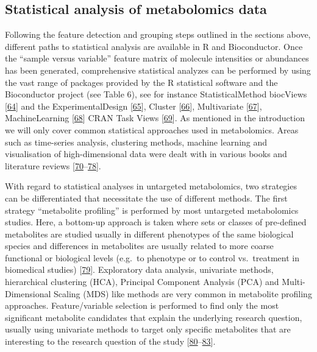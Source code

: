 \documentclass[]{article}
\begin{document}
\newpage

\hypertarget{statistical-analysis-of-metabolomics-data}{%
\subsection{Statistical analysis of metabolomics data}\label{statistical-analysis-of-metabolomics-data}}

Following the feature detection and grouping steps outlined in the sections above, different paths to statistical analysis are available in R and Bioconductor. Once the ``sample versus variable'' feature matrix of molecule intensities or abundances has been generated, comprehensive statistical analyzes can be performed by using the vast range of packages provided by the R statistical software and the Bioconductor project (see Table 6), see for instance StatisticalMethod biocViews {[}\protect\hyperlink{ref-bioconductor_website_ndb}{64}{]} and the ExperimentalDesign {[}\protect\hyperlink{ref-groemping_website_2019}{65}{]}, Cluster {[}\protect\hyperlink{ref-leisch_website_2019}{66}{]}, Multivariate {[}\protect\hyperlink{ref-hewson_website_2018}{67}{]}, MachineLearning {[}\protect\hyperlink{ref-hothorn_website_2019}{68}{]} CRAN Task Views {[}\protect\hyperlink{ref-thecomprehensiverarchivenetwork_website_nda}{69}{]}. As mentioned in the introduction we will only cover common statistical approaches used in metabolomics. Areas such as time-series analysis, clustering methods, machine learning and visualisation of high-dimensional data were dealt with in various books and literature reviews {[}\protect\hyperlink{ref-bishop_2006}{70}--\protect\hyperlink{ref-zaslavsky_2016}{78}{]}.

With regard to statistical analyses in untargeted metabolomics, two strategies can be differentiated that necessitate the use of different methods. The first strategy ``metabolite profiling'' is performed by most untargeted metabolomics studies. Here, a bottom-up approach is taken where sets or classes of pre-defined metabolites are studied usually in different phenotypes of the same biological species and differences in metabolites are usually related to more coarse functional or biological levels (e.g.~to phenotype or to control vs.~treatment in biomedical studies) {[}\protect\hyperlink{ref-hall_2011}{79}{]}. Exploratory data analysis, univariate methods, hierarchical clustering (HCA), Principal Component Analysis (PCA) and Multi-Dimensional Scaling (MDS) like methods are very common in metabolite profiling approaches. Feature/variable selection is performed to find only the most significant metabolite candidates that explain the underlying research question, usually using univariate methods to target only specific metabolites that are interesting to the research question of the study {[}\protect\hyperlink{ref-cai_2017}{80}--\protect\hyperlink{ref-wen_2017}{83}{]}.
\end{document}
